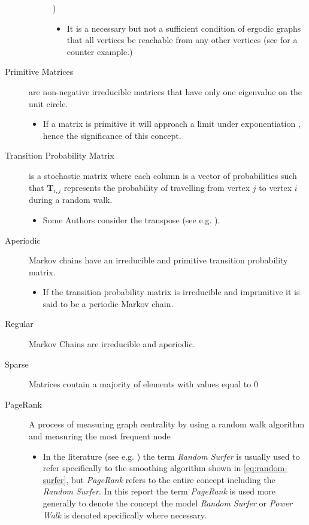 \documentclass[11pt]{article}
\begin{document}
\begin{description}
\begin{description}
\cite{nathanaelackermancameronfreeralexkruckmanandrehanapatelProperlyErodicStructures2017,chenEigenvaluesInequalitiesErgodic2005})
\begin{itemize}
\item It is a necessary but not a sufficient condition of ergodic graphs that all vertices be reachable from any other vertices (see \cite{sazProbabilityTheoryThis} for a counter example.)
\end{itemize}
\end{description}
\item[{Primitive Matrices}] are non-negative irreducible matrices that have only one eigenvalue on the unit circle.
\begin{itemize}
\item If a matrix is primitive it will approach a limit under exponentiation \cite[]{langvilleGooglePageRankScience2012}, hence the significance of this concept.
\end{itemize}
\item[{Transition Probability Matrix}] is a stochastic matrix where each column is a vector of probabilities such that \(\mathbf{T}_{i,j}\) represents the probability of travelling from vertex \(j\) to vertex \(i\) during a random walk.
\begin{itemize}
\item Some Authors consider the transpose (see e.g. \cite{langvilleGooglePageRankScience2012}).
\end{itemize}
\item[{Aperiodic}] Markov chains have an irreducible and primitive transition probability matrix.
\begin{itemize}
\item If the transition probability matrix is irreducible and imprimitive it is said to be a periodic Markov chain.
\end{itemize}
\item[{Regular}] Markov Chains are irreducible and aperiodic.
\item[{Sparse}] Matrices contain a majority of elements with values equal to 0 \cite[]{langvilleGooglePageRankScience2012}
\item[{PageRank}] A process of measuring graph centrality by using a random walk algorithm and measuring the most frequent node
\begin{itemize}
\item In the literature (see e.g.
\cite{guptaWTFWhoFollow2013,langvilleGooglePageRankScience2012}) the term \emph{Random
Surfer} is usually used to refer specifically to the smoothing
algorithm shown in \eqref{eq:random-surfer}, but \emph{PageRank} refers to the entire concept including the \emph{Random Surfer}. In this report the term \emph{PageRank} is used more generally to denote the concept the model \emph{Random Surfer} or \emph{Power Walk} is denoted specifically where necessary.
\end{itemize}
\end{description}
\end{document}
